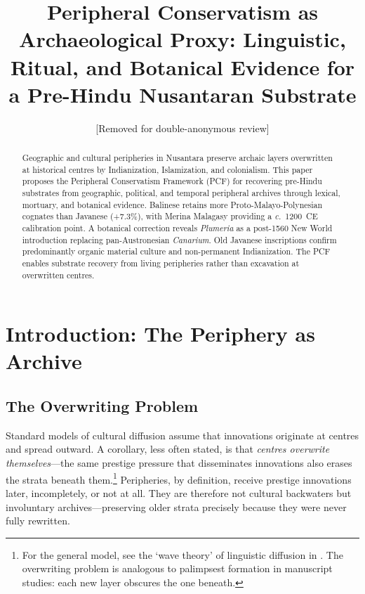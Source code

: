 \documentclass[12pt,a4paper]{article}
\title{\textbf{Peripheral Conservatism as Archaeological Proxy: Linguistic, Ritual, and Botanical Evidence for a Pre-Hindu Nusantaran Substrate}}
\author{[Removed for double-anonymous review]}
\date{}
\begin{document}
\maketitle
\thispagestyle{empty}

\begin{abstract}
\noindent
Geographic and cultural peripheries in Nusantara preserve archaic layers overwritten at historical centres by Indianization, Islamization, and colonialism. This paper proposes the Peripheral Conservatism Framework (PCF) for recovering pre-Hindu substrates from geographic, political, and temporal peripheral archives through lexical, mortuary, and botanical evidence. Balinese retains more Proto-Malayo-Polynesian cognates than Javanese (+7.3\%), with Merina Malagasy providing a \textit{c.}~1200~CE calibration point. A botanical correction reveals \textit{Plumeria} as a post-1560 New World introduction replacing pan-Austronesian \textit{Canarium}. Old Javanese inscriptions confirm predominantly organic material culture and non-permanent Indianization. The PCF enables substrate recovery from living peripheries rather than excavation at overwritten centres.
\end{abstract}

\newpage
\setcounter{page}{1}

\section{Introduction: The Periphery as Archive}

\subsection{The Overwriting Problem}

Standard models of cultural diffusion assume that innovations originate at centres and spread outward. A corollary, less often stated, is that \emph{centres overwrite themselves}---the same prestige pressure that disseminates innovations also erases the strata beneath them.\footnote{For the general model, see the `wave theory' of linguistic diffusion in \autocite{blust1995austronesian}. The overwriting problem is analogous to palimpsest formation in manuscript studies: each new layer obscures the one beneath.} Peripheries, by definition, receive prestige innovations later, incompletely, or not at all. They are therefore not cultural backwaters but involuntary archives---preserving older strata precisely because they were never fully rewritten.
\end{document}
